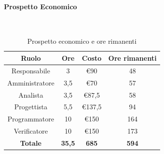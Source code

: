 \documentclass{article}
\begin{document}
                \paragraph{Prospetto Economico}\mbox{}\\
                \begin{table}[H]
                    \centering
                    \begin{tabular}{|c|c|c|c|}
                    \hline
                    \textbf{Ruolo}  & \textbf{Ore}  & \textbf{Costo} & \textbf{Ore rimanenti} \\ \hline
                    Responsabile    & 3             & €90            & 48                     \\ \hline
                    Amministratore  & 3,5           & €70            & 57                   \\ \hline
                    Analista        & 3,5           & €87,5          & 58                   \\ \hline
                    Progettista     & 5,5           & €137,5         & 94                   \\ \hline
                    Programmatore   & 10            & €150           & 164                    \\ \hline
                    Verificatore    & 10            & €150           & 173                    \\ \hline
                    \textbf{Totale} & \textbf{35,5} & \textbf{685}   & \textbf{594}         \\ \hline
                    \end{tabular}
                    \caption{Prospetto economico e ore rimanenti}
                \end{table}
\end{document}
